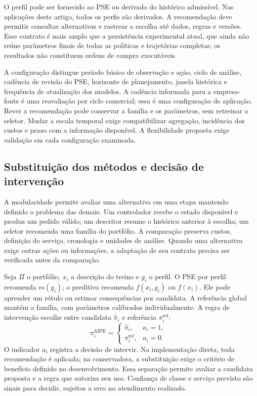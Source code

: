 \documentclass[preprint,12pt]{elsarticle}
\begin{document}
O perfil pode ser fornecido ao PSE ou derivado do histórico admissível. Nas aplicações deste artigo, todos os perfis são derivados. A recomendação deve permitir consultar alternativas e rastrear a escolha até dados, regras e versões. Esse contrato é mais amplo que a persistência experimental atual, que ainda não reúne parâmetros finais de todas as políticas e trajetórias completas; os resultados não constituem ordens de compra executáveis.

A configuração distingue período básico de observação e ação, ciclo de análise, cadência de revisão do PSE, horizonte de planejamento, janela histórica e frequência de atualização dos modelos. A cadência informada para a empresa-fonte é uma reavaliação por ciclo comercial; essa é uma configuração de aplicação. Rever a recomendação pode conservar a família e os parâmetros, sem retreinar o seletor. Mudar a escala temporal exige compatibilizar agregação, incidência dos custos e prazo com a informação disponível. A flexibilidade proposta exige validação em cada configuração examinada.

\subsection{Substituição dos métodos e decisão de intervenção}
A modularidade permite avaliar uma alternativa em uma etapa mantendo definido o problema das demais. Um controlador recebe o estado disponível e produz um pedido válido; um descritor resume o histórico anterior à escolha; um seletor recomenda uma família do portfólio. A comparação preserva custos, definição do serviço, cronologia e unidades de análise. Quando uma alternativa exige outras ações ou informações, a adaptação de seu contrato precisa ser verificada antes da comparação.

Seja $\Pi$ o portfólio, $x_i$ a descrição do treino e $g_i$ o perfil. O PSE por perfil recomenda $m(g_i)$; o preditivo recomenda $f(x_i,g_i)$ ou $f(x_i)$. Ele pode aprender um rótulo ou estimar consequências por candidata. A referência global mantém a família, com parâmetros calibrados individualmente. A regra de intervenção escolhe entre candidata $\widehat\pi_i$ e referência $\pi_i^{\mathrm{ref}}$:
\[
 \pi_i^{\mathrm{AIPE}}=
 \begin{cases}\widehat\pi_i,&a_i=1,\\\pi_i^{\mathrm{ref}},&a_i=0.\end{cases}
\]
O indicador $a_i$ registra a decisão de intervir. Na implementação direta, toda recomendação é aplicada; na conservadora, a substituição exige o critério de benefício definido no desenvolvimento. Essa separação permite avaliar a candidata proposta e a regra que autoriza seu uso. Confiança de classe e serviço previsto são sinais para decidir, sujeitos a erro no atendimento realizado.
\end{document}
